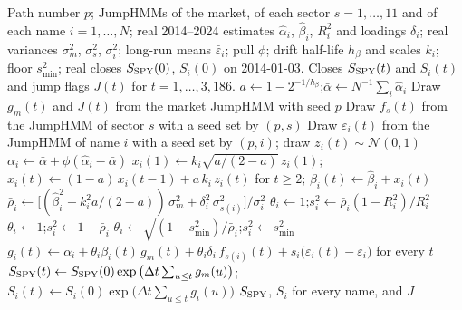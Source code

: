 \begin{algorithm}[t]
\caption{One synthetic future of the $373$-name market over the full calendar, 2014-01-03 to 2026-09-04.}
\label{alg:generator}
\small
\begin{algorithmic}[1]
  \REQUIRE Path number $p$; JumpHMMs of the market, of each sector $s = 1, \dots, 11$ and of each name
    $i = 1, \dots, N$; real 2014--2024 estimates $\hat\alpha_i$, $\hat\beta_i$, $R_i^2$ and loadings $\delta_i$; real
    variances $\sigma_m^2$, $\sigma_s^2$, $\sigma_i^2$; long-run means $\bar\varepsilon_i$; pull $\phi$; drift
    half-life $h_\beta$ and scales $k_i$; floor $s_{\min}^2$; real closes $S_{\rm SPY}(0)$, $S_i(0)$ on 2014-01-03.
  \ENSURE Closes $S_{\rm SPY}(t)$ and $S_i(t)$ and jump flags $J(t)$ for $t = 1, \dots, 3{,}186$.
  \STATE $a \gets 1 - 2^{-1/h_\beta}$;\quad $\bar\alpha \gets N^{-1}\sum_i \hat\alpha_i$
  \STATE Draw $g_m(t)$ and $J(t)$ from the market JumpHMM with seed $p$
    \hfill {}
    \STATE Draw $f_s(t)$ from the JumpHMM of sector $s$ with a seed set by $(p, s)$
  \ENDFOR
    \STATE Draw $\varepsilon_i(t)$ from the JumpHMM of name $i$ with a seed set by $(p, i)$;\quad
      draw $z_i(t) \sim \mathcal{N}(0, 1)$
    \STATE $\alpha_i \gets \bar\alpha + \phi(\hat\alpha_i - \bar\alpha)$
    \STATE $x_i(1) \gets k_i\sqrt{a/(2-a)}\, z_i(1)$;\quad
      $x_i(t) \gets (1-a)\, x_i(t-1) + a\, k_i\, z_i(t)$ for $t \ge 2$;\quad
      $\beta_i(t) \gets \hat\beta_i + x_i(t)$
      \hfill {}
    \STATE $\bar\rho_i \gets \big[(\hat\beta_i^2 + k_i^2 a/(2-a))\,\sigma_m^2 + \delta_i^2\,\sigma_{s(i)}^2\big]
      / \sigma_i^2$
      \hfill {}
      \STATE $\theta_i \gets 1$;\quad $s_i^2 \gets \bar\rho_i (1 - R_i^2)/R_i^2$
        \hfill {}
      \STATE $\theta_i \gets 1$;\quad $s_i^2 \gets 1 - \bar\rho_i$
    \ELSE
      \STATE $\theta_i \gets \sqrt{(1 - s_{\min}^2)/\bar\rho_i}$;\quad $s_i^2 \gets s_{\min}^2$
        \hfill {}
    \ENDIF
    \STATE $g_i(t) \gets \alpha_i + \theta_i \beta_i(t)\, g_m(t) + \theta_i \delta_i\, f_{s(i)}(t)
      + s_i\big(\varepsilon_i(t) - \bar\varepsilon_i\big)$ for every $t$
      \hfill {}
  \ENDFOR
  \STATE $S_{\rm SPY}(t) \gets S_{\rm SPY}(0)\exp\big(\Delta t \sum_{u \le t} g_m(u)\big)$;\quad
    $S_i(t) \gets S_i(0)\exp\big(\Delta t \sum_{u \le t} g_i(u)\big)$
  \RETURN $S_{\rm SPY}$, $S_i$ for every name, and $J$
\end{algorithmic}
\end{algorithm}

